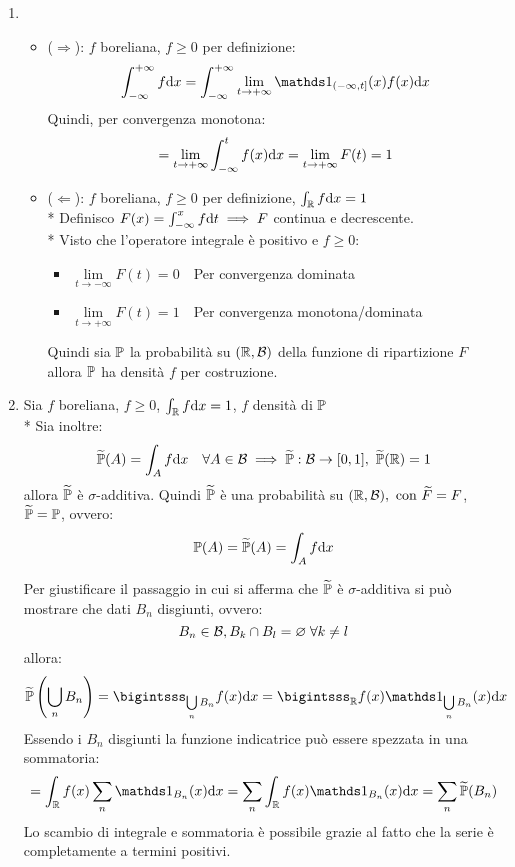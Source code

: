 \begin{dimo}
  \Fixvmode
  \begin{enumerate}
    \item
    \begin{itemize}
      \item ($\Longrightarrow$): $f$ boreliana, $f \geq 0$ per definizione:
        $$\int_{-\infty}^{+\infty} f \dx = \int_{-\infty}^{+\infty} \lim_{t \to +\infty} \Ind_{(-\infty, t]} (x) f(x) \dx$$
        Quindi, per convergenza monotona:
        $$ = \lim_{t \to +\infty} \int_{-\infty}^{t} f(x) \mathrm d x = \lim_{t \to +\infty} F(t) = 1$$
      \item ($\Longleftarrow$): $f$ boreliana, $f \geq 0$ per definizione, $\int_{\mathbb R} f \mathrm d x = 1$  \\*
        Definisco $F(x) = \int_{-\infty}^{x} f \mathrm d t \implies F$ continua e decrescente.\\*
        Visto che l'operatore integrale è positivo e $f \geq 0$:
        \begin{itemize}
          \item $\lim\limits_{t \to -\infty} F(t) = 0 \quad$Per convergenza dominata
          \item $\lim\limits_{t \to +\infty} F(t) = 1 \quad$Per convergenza monotona/dominata
        \end{itemize}
        Quindi sia $\mathbb P$ la probabilità su $(\mathbb R, \mathcal B)$ della funzione di ripartizione $F$
        allora $\mathbb P$ ha densità $f$ per costruzione.
    \end{itemize}
    \medskip
    \item Sia $f$ boreliana, $f \geq 0$, $\int_{\mathbb R} f \mathrm d x = 1$, $f$ densità di $\mathbb P$\\*
      Sia inoltre:
      $$\widetilde{\mathbb P}(A) = \int_{A} f \mathrm d x \quad \forall A \in \mathcal B \implies \widetilde{\mathbb P}: \mathcal B \to [0,1], \ \widetilde{\mathbb P}(\mathbb R) = 1$$
      allora $\widetilde{\mathbb P}$ è $\sigma$-additiva.
      Quindi $\widetilde{\mathbb P}$ è una probabilità su $(\mathbb R, \mathcal B), \text{ con } \widetilde{F} = F$, $\widetilde{\mathbb P} = \mathbb P$, ovvero:
      $$\mathbb P(A) = \widetilde{\mathbb P}(A) = \int_{A} f \mathrm d x$$

      Per giustificare il passaggio in cui si afferma che $\widetilde{\mathbb P}$ è $\sigma$-additiva si può mostrare che dati $B_n$ disgiunti, ovvero:
      $$B_n \in \mathcal B, B_k \cap B_l = \varnothing \; \forall k \neq l$$
      allora:
      $$\widetilde{\PP} \left(\bigcup\limits_{n} B_n \right) = \bigintsss_{\bigcup\limits_{n} B_n} f(x) \dx = \bigintsss_{\RR} f(x) \Ind_{\bigcup\limits_{n} B_n}  (x) \dx$$
      Essendo i $B_n$ disgiunti la funzione indicatrice può essere spezzata in una sommatoria:
      $$= \int_{\RR} f(x) \sum\limits_{n} \Ind_{B_n} (x) \dx  = \sum\limits_{n} \int_{\RR} f(x) \Ind_{B_n} (x) \dx = \sum\limits_{n} \widetilde{\PP}(B_n)$$
      Lo scambio di integrale e sommatoria è possibile grazie al fatto che la serie è completamente a termini positivi.


\end{enumerate}
\end{dimo}
